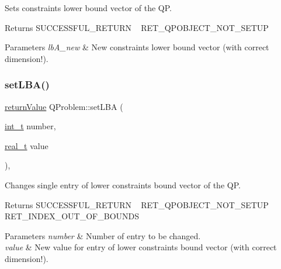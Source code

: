 Sets constraints\textquotesingle{} lower bound vector of the QP. \begin{DoxyReturn}{Returns}
S\+U\+C\+C\+E\+S\+S\+F\+U\+L\+\_\+\+R\+E\+T\+U\+RN ~\newline
 R\+E\+T\+\_\+\+Q\+P\+O\+B\+J\+E\+C\+T\+\_\+\+N\+O\+T\+\_\+\+S\+E\+T\+UP 
\end{DoxyReturn}

\begin{DoxyParams}{Parameters}
{\em lb\+A\+\_\+new} & New constraints\textquotesingle{} lower bound vector (with correct dimension!). \\
\hline
\end{DoxyParams}
\mbox{\label{class_q_problem_a36d126fde1eafd33e971ab1a11458b0a}} 
\subsubsection{\texorpdfstring{set\+L\+B\+A()}{setLBA()}\hspace{0.1cm}{\footnotesize\ttfamily [2/2]}}
{\footnotesize\ttfamily \hyperlink{_message_handling_8hpp_a81d556f613bfbabd0b1f9488c0fa865e}{return\+Value} Q\+Problem\+::set\+L\+BA (\begin{DoxyParamCaption}\item[{\hyperlink{_types_8hpp_ab6fd6105e64ed14a0c9281326f05e623}{int\+\_\+t}}]{number,  }\item[{\hyperlink{qp_o_a_s_e_s__wrapper_8h_a0d00e2b3dfadee81331bbb39068570c4}{real\+\_\+t}}]{value }\end{DoxyParamCaption})\hspace{0.3cm}{\ttfamily [inline]}, {\ttfamily [protected]}}

Changes single entry of lower constraints\textquotesingle{} bound vector of the QP. \begin{DoxyReturn}{Returns}
S\+U\+C\+C\+E\+S\+S\+F\+U\+L\+\_\+\+R\+E\+T\+U\+RN ~\newline
 R\+E\+T\+\_\+\+Q\+P\+O\+B\+J\+E\+C\+T\+\_\+\+N\+O\+T\+\_\+\+S\+E\+T\+UP ~\newline
 R\+E\+T\+\_\+\+I\+N\+D\+E\+X\+\_\+\+O\+U\+T\+\_\+\+O\+F\+\_\+\+B\+O\+U\+N\+DS 
\end{DoxyReturn}

\begin{DoxyParams}{Parameters}
{\em number} & Number of entry to be changed. \\
\hline
{\em value} & New value for entry of lower constraints\textquotesingle{} bound vector (with correct dimension!). \\
\hline
\end{DoxyParams}
\mbox{\label{class_q_problem_a354fa56e3cf364846f31dcd68e3b8d02}} 
